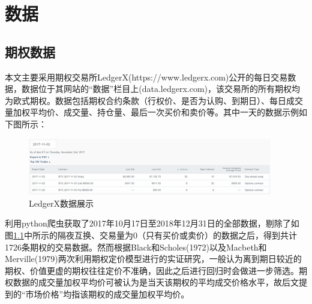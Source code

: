\chapter{数据}
\section{期权数据}
\par{    
本文主要采用期权交易所LedgerX(https://www.ledgerx.com)公开的每日交易数据，数据位于其网站的“数据”栏目上(data.ledgerx.com)，该交易所的所有期权均为欧式期权。数据包括期权合约条款（行权价、是否为认购、到期日）、每日成交量加权平均价、成交量、持仓量、最后一次买价和卖价等。其中一天的数据示例如下图所示：
\begin{figure}[H]
\begin{small}
\begin{center}
\includegraphics[width=0.95\textwidth]{figures/data_example.png}
\end{center}
\caption{LedgerX数据展示}
\label{data_example}
\end{small}
\end{figure}
利用python爬虫获取了2017年10月17日至2018年12月31日的全部数据，剔除了如图\ref{data_example}中所示的隔夜互换、交易量为0（只有买价或卖价）的数据之后，得到共计1726条期权的交易数据。然而根据Black和Scholes(1972)\cite{J-1972}以及Macbeth和Merville(1979)\cite{Jame-1979}两次利用期权定价模型进行的实证研究，一般认为离到期日较近的期权、价值更虚的期权往往定价不准确，因此之后进行回归时会做进一步筛选。期权数据的成交量加权平均价可被认为是当天该期权的平均成交价格水平，故后文提到的“市场价格”均指该期权的成交量加权平均价。
} 

